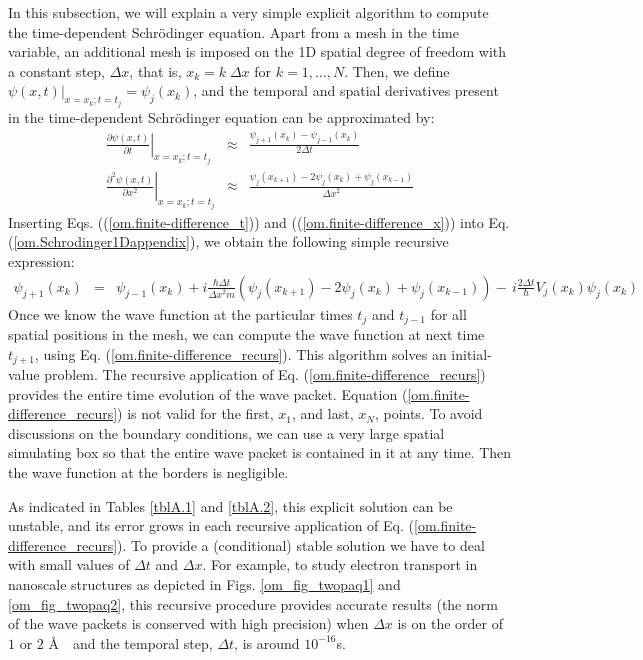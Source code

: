 \documentclass[onecolumn,nofootinbib, secnumarabic, amsmath, nobibnotes,12pt,aps,pra]{revtex4-1}
\newcommand{\pref}[1]{(\ref{#1})}
\newcommand{\eref}[1]{Eq. (\ref{#1})}
\newcommand{\Eref}[1]{Equation (\ref{#1})}
\begin{document}
In this subsection, we will explain a very simple explicit algorithm to compute the time-dependent Schr\"odinger equation. Apart from a mesh in the time variable, an additional mesh is imposed on the 1D spatial degree of freedom with a constant step, $\Delta x$, that is, $x_k = k \; \Delta x $ for $k = 1,\ldots,N$. Then, we define $\psi(x,t)|_{x = x_k;t = t_j} = \psi_{j}(x_k)$, and the temporal and spatial derivatives present in the time-dependent Schr\"odinger equation can be approximated by:
\begin{eqnarray}
\left.\frac{\partial \psi \left(x,t \right)}{\partial t}\right|_{x = x_k;t = t_j} &\approx& \frac{\psi_{j + 1}(x_k) - \psi_{j - 1}(x_k)} {2\Delta t} \label{om.finite-difference_t} \\
\left.\frac{{{\partial }^{2}}\psi \left( x,t \right)}{\partial {{x}^{2}}}\right|_{x = x_k;t = t_j} &\approx& \frac{\psi_{j}(x_{k + 1}) - 2\psi_{j}(x_{k}) + \psi_{j}(x_{k - 1})}{{\Delta x}^{2}} \label{om.finite-difference_x}
\end{eqnarray}
Inserting Eqs. (\pref{om.finite-difference_t}) and (\pref{om.finite-difference_x}) into \eref{om.Schrodinger1Dappendix}, we obtain the following simple recursive expression:
\begin{eqnarray}
\psi_{j + 1}(x_{k}) &=& \psi_{j - 1}(x_{k}) + i\frac{\hbar \Delta t}{{{\Delta x}^{2}}m}\left(\psi_{j}(x_{k + 1}) - 2\psi_{j}(x_{k}) + \psi_{j}(x_{k - 1})\right)-\,i\frac{2\Delta t}{\hbar }V_{j}(x_k) \psi_{j}(x_{k})
\label{om.finite-difference_recurs}
\end{eqnarray}
Once we know the wave function at the particular times $t_j$ and
$t_{j - 1}$ for all spatial positions in the mesh, we can compute
the wave function at next time $t_{j + 1}$, using
\eref{om.finite-difference_recurs}. This algorithm solves an
initial-value problem. The recursive application of
\eref{om.finite-difference_recurs} provides the entire time
evolution of the wave packet. \Eref{om.finite-difference_recurs} is
not valid for the first, $x_1$, and last, $x_N$, points. To avoid
discussions on the boundary conditions, we can use a very large
spatial simulating box so that the entire wave packet is contained
in it at any time. Then the wave function at the borders is
negligible.\enlargethispage{-1pc}

As indicated in Tables \ref{tblA.1} and \ref{tblA.2}, this explicit
solution can be unstable, and its error grows in each recursive
application of \eref{om.finite-difference_recurs}. To provide a
(conditional) stable solution we have to deal with small
values of $\Delta t$ and $\Delta x$. For example, to study electron
transport in nanoscale structures as depicted in
Figs. \ref{om_fig_twopaq1} and \ref{om_fig_twopaq2}, this recursive
procedure provides accurate results (the norm of the wave packets is
conserved with high precision) when $\Delta x$ is on the order of
$1$ or $2$ \AA \  \ and the temporal step, $\Delta t$, is around
$10^{-16}$s.
\end{document}
